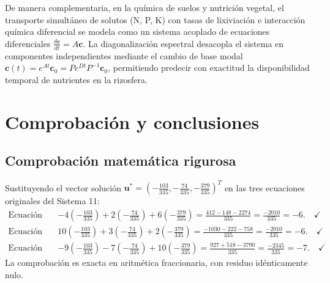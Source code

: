 \documentclass[spanish,letterpaper,oneside]{article}
\begin{document}
De manera complementaria, en la química de suelos y nutrición vegetal, el transporte simultáneo de solutos (N, P, K) con tasas de lixiviación e interacción química diferencial se modela como un sistema acoplado de ecuaciones diferenciales $\frac{d\mathbf{c}}{dt} = A\mathbf{c}$. La diagonalización espectral desacopla el sistema en componentes independientes mediante el cambio de base modal $\mathbf{c}(t) = e^{At}\mathbf{c}_0 = P e^{Dt} P^{-1}\mathbf{c}_0$, permitiendo predecir con exactitud la disponibilidad temporal de nutrientes en la rizosfera.

\section{Comprobación y conclusiones}

\subsection{Comprobación matemática rigurosa}
Sustituyendo el vector solución $\mathbf{u}^* = \left(-\frac{103}{335}, -\frac{74}{335}, -\frac{379}{335}\right)^T$ en las tres ecuaciones originales del Sistema 11:
\begin{align}
\text{Ecuación 1:} \quad & -4\left(-\frac{103}{335}\right) + 2\left(-\frac{74}{335}\right) + 6\left(-\frac{379}{335}\right) = \frac{412 - 148 - 2274}{335} = \frac{-2010}{335} = -6. \quad \checkmark \\
\text{Ecuación 2:} \quad & 10\left(-\frac{103}{335}\right) + 3\left(-\frac{74}{335}\right) + 2\left(-\frac{379}{335}\right) = \frac{-1030 - 222 - 758}{335} = \frac{-2010}{335} = -6. \quad \checkmark \\
\text{Ecuación 3:} \quad & -9\left(-\frac{103}{335}\right) - 7\left(-\frac{74}{335}\right) + 10\left(-\frac{379}{335}\right) = \frac{927 + 518 - 3790}{335} = \frac{-2345}{335} = -7. \quad \checkmark
\end{align}
La comprobación es exacta en aritmética fraccionaria, con residuo idénticamente nulo.
\end{document}

